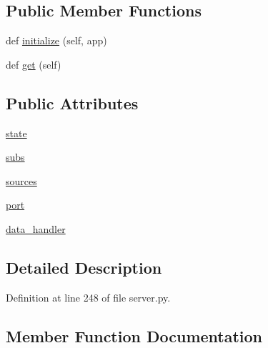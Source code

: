 \subsection*{Public Member Functions}
\begin{DoxyCompactItemize}
\item 
def \hyperlink{classparlai_1_1mturk_1_1webapp_1_1server_1_1TaskListHandler_a65f561e308d076bc129463480e83ffe5}{initialize} (self, app)
\item 
def \hyperlink{classparlai_1_1mturk_1_1webapp_1_1server_1_1TaskListHandler_ab7ff1ab2120e64b2f23aadb29d4eeac9}{get} (self)
\end{DoxyCompactItemize}
\subsection*{Public Attributes}
\begin{DoxyCompactItemize}
\item 
\hyperlink{classparlai_1_1mturk_1_1webapp_1_1server_1_1TaskListHandler_a130bda83b244ddc1ef7c461a10d90ce9}{state}
\item 
\hyperlink{classparlai_1_1mturk_1_1webapp_1_1server_1_1TaskListHandler_a9cbeab910d93da1b08334339c3a93bdf}{subs}
\item 
\hyperlink{classparlai_1_1mturk_1_1webapp_1_1server_1_1TaskListHandler_a7ebaf2e0e17b3caa6052a3ca975dbda9}{sources}
\item 
\hyperlink{classparlai_1_1mturk_1_1webapp_1_1server_1_1TaskListHandler_aeb14ed26510ea0b82bb22608b4073709}{port}
\item 
\hyperlink{classparlai_1_1mturk_1_1webapp_1_1server_1_1TaskListHandler_a2325ea777c0b0807a28d7bbbf9eb422b}{data\+\_\+handler}
\end{DoxyCompactItemize}


\subsection{Detailed Description}


Definition at line 248 of file server.\+py.



\subsection{Member Function Documentation}
\mbox{\label{classparlai_1_1mturk_1_1webapp_1_1server_1_1TaskListHandler_ab7ff1ab2120e64b2f23aadb29d4eeac9}} 
